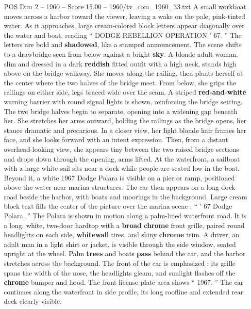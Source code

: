 \begin{textsample}{POS Dim 2 – 1960 – Score 15.00 – 1960/tv\_com\_1960\_33.txt}  \label{ex:f2_pos_015}
A small workboat moves across a harbor toward the viewer, leaving a wake on the pale, pink-tinted water.
As it approaches, large cream-colored block letters appear diagonally over the water and boat, reading “ DODGE REBELLION OPERATION ’ 67. ” The letters are bold and \textbf{shadowed}, like a stamped announcement.
The scene shifts to a drawbridge seen from below against a bright \textbf{sky}.
A blonde adult woman, slim and dressed in a dark \textbf{reddish} fitted outfit with a high neck, stands high above on the bridge walkway.
She moves along the railing, then plants herself at the center where the two halves of the bridge meet.
From below, she grips the railings on either side, legs braced wide over the seam.
A striped \textbf{red-and-white} warning barrier with round signal lights is shown, reinforcing the bridge setting.
The two bridge halves begin to separate, opening into a widening gap beneath her.
She stretches her arms outward, holding the railings as the bridge opens, her stance dramatic and precarious.
In a closer view, her light blonde hair frames her face, and she looks forward with an intent expression.
Then, from a distant overhead-looking view, she appears tiny between the two raised bridge sections and drops down through the opening, arms lifted.
At the waterfront, a sailboat with a large white sail sits near a dock while people are seated low in the boat.
Beyond it, a white 1967 Dodge Polara is visible on a pier or ramp, positioned above the water near marina structures.
The car then appears on a long dock road beside the harbor, with boats and moorings in the background.
Large cream block text fills the center of the picture over the marina scene : “ ’ 67 Dodge Polara. ” The Polara is shown in motion along a palm-lined waterfront road.
It is a long, white, two-door hardtop with a \textbf{broad} \textbf{chrome} front grille, paired round headlights on each side, \textbf{whitewall} tires, and shiny \textbf{chrome} trim.
A driver, an adult man in a light shirt or jacket, is visible through the side window, seated upright at the wheel.
Palm \textbf{trees} and boats \textbf{pass} behind the car, and the harbor stretches across the background.
The front of the car is emphasized : its grille spans the width of the nose, the headlights gleam, and sunlight flashes off the \textbf{chrome} bumper and hood.
The front license plate area shows “ 1967. ” The car continues along the waterfront in side profile, its long roofline and extended rear deck clearly visible.

\end{textsample}
